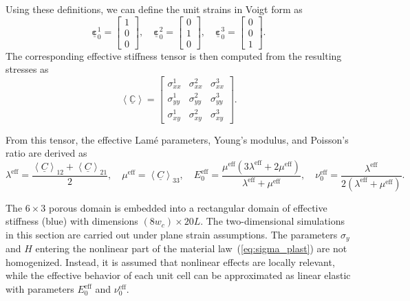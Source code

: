 \documentclass[pdflatex,sn-mathphys-num]{sn-jnl}%
\theoremstyle{thmstyleone}%
\theoremstyle{thmstyletwo}%
\theoremstyle{thmstylethree}%
\begin{document}
Using these definitions, we can define the unit strains in Voigt form as
\begin{equation}
\underline{\boldsymbol{\varepsilon}}_0^1 =
\begin{bmatrix} 1 \\ 0 \\ 0 \end{bmatrix}, \quad
\underline{\boldsymbol{\varepsilon}}_0^2 =
\begin{bmatrix} 0 \\ 1 \\ 0 \end{bmatrix}, \quad
\underline{\boldsymbol{\varepsilon}}_0^3 =
\begin{bmatrix} 0 \\ 0 \\ 1 \end{bmatrix}.
\end{equation}
The corresponding effective stiffness tensor is then computed from the resulting stresses as
\begin{equation}
    \left< \underline{\boldsymbol{\mathbb{C}}} \right> =
    \begin{bmatrix}
         \sigma_{xx}^1 & \sigma_{xx}^2 & \sigma_{xx}^3 \\
         \sigma_{yy}^1 & \sigma_{yy}^2 & \sigma_{yy}^3 \\
         \sigma_{xy}^1 & \sigma_{xy}^2 & \sigma_{xy}^3
     \end{bmatrix}.
\end{equation}


From this tensor, the effective Lamé parameters, Young’s modulus, and Poisson’s ratio are derived as
\begin{equation}
    \lambda^{\text{eff}} = \dfrac{\left< \underline{C} \right>_{12} + \left< \underline{C} \right>_{21}}{2}, \quad
    \mu^{\text{eff}} = \left< \underline{C} \right>_{33}, \quad
    E_0^{\text{eff}} = \dfrac{\mu^{\text{eff}} (3 \lambda^{\text{eff}} + 2 \mu^{\text{eff}})}{\lambda^{\text{eff}} + \mu^{\text{eff}}}, \quad
    \nu_0^{\text{eff}} = \dfrac{\lambda^{\text{eff}}}{2 (\lambda^{\text{eff}} + \mu^{\text{eff}})}.
\end{equation}

The $6 \times 3$ porous domain is embedded into a rectangular domain of effective stiffness (blue) with dimensions $(8 w_c) \times 20 L$. The two-dimensional simulations in this section are carried out under plane strain assumptions. The parameters $\sigma_y$ and $H$ entering the nonlinear part of the material law~(\ref{eq:sigma_plast}) are not homogenized. 
Instead, it is assumed that nonlinear effects are locally relevant, while the effective behavior of each unit cell can be approximated as linear elastic with parameters $E_0^{\text{eff}}$ and $\nu_0^{\text{eff}}$. 
\end{document}
